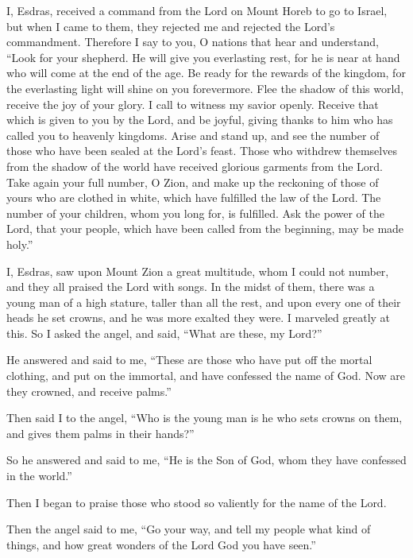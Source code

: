  I, Esdras, received a command from the Lord on Mount
Horeb to go to Israel, but when I came to them, they rejected me and
rejected the Lord's commandment.  Therefore I say to you,
O nations that hear and understand, ``Look for your shepherd. He will
give you everlasting rest, for he is near at hand who will come at the
end of the age.  Be ready for the rewards of the kingdom,
for the everlasting light will shine on you forevermore. 
Flee the shadow of this world, receive the joy of your glory. I call to
witness my savior openly.  Receive that which is given to
you by the Lord, and be joyful, giving thanks to him who has called you
to heavenly kingdoms.  Arise and stand up, and see the
number of those who have been sealed at the Lord's feast.
 Those who withdrew themselves from the shadow of the
world have received glorious garments from the Lord. 
Take again your full number, O Zion, and make up the reckoning of those
of yours who are clothed in white, which have fulfilled the law of the
Lord.  The number of your children, whom you long for, is
fulfilled. Ask the power of the Lord, that your people, which have been
called from the beginning, may be made holy.''

 I, Esdras, saw upon Mount Zion a great multitude, whom I
could not number, and they all praised the Lord with songs.
 In the midst of them, there was a young man of a high
stature, taller than all the rest, and upon every one of their heads he
set crowns, and he was more exalted they were. I marveled greatly at
this.  So I asked the angel, and said, ``What are these,
my Lord?''

 He answered and said to me, ``These are those who have
put off the mortal clothing, and put on the immortal, and have confessed
the name of God. Now are they crowned, and receive palms.''

 Then said I to the angel, ``Who is the young man is he
who sets crowns on them, and gives them palms in their hands?''

 So he answered and said to me, ``He is the Son of God,
whom they have confessed in the world.''

Then I began to praise those who stood so valiently for the name of the
Lord.

 Then the angel said to me, ``Go your way, and tell my
people what kind of things, and how great wonders of the Lord God you
have seen.''

